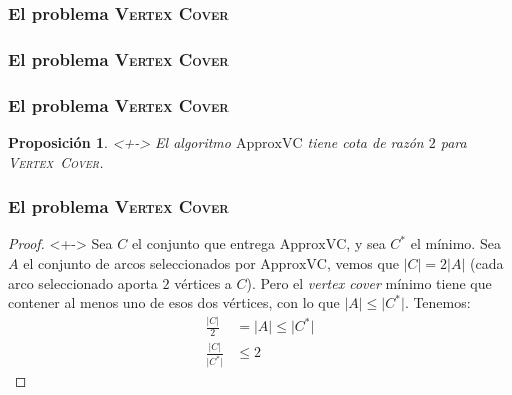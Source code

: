 \documentclass[english, spanish, fleqn,%
hyperref = {colorlinks, urlcolor = blue}%
]{beamer}
\newtheorem{proposition}{Proposición}
\begin{document}
\begin{frame}
  \setcounter{beamerpauses}{2}
  \frametitle{El problema \textsc{Vertex Cover}}

\end{frame}

\begin{frame}
  \frametitle{El problema \textsc{Vertex Cover}}

    \begin{algorithm}[H]
      \DontPrintSemicolon

    \end{algorithm}
\end{frame}

\begin{frame}
  \setcounter{beamerpauses}{2}
  \frametitle{El problema \textsc{Vertex Cover}}

  \begin{proposition}<+->
    El algoritmo \(\mathrm{ApproxVC}\) tiene cota de razón \(2\)
    para \textsc{Vertex~Cover}.
  \end{proposition}
\end{frame}

\begin{frame}
  \setcounter{beamerpauses}{2}
  \frametitle{El problema \textsc{Vertex Cover}}

  \begin{proof}<+->
    Sea \(C\) el conjunto que entrega \(\mathrm{ApproxVC}\),
    y sea \(C^*\) el mínimo.
    Sea \(A\) el conjunto de arcos
    seleccionados por \(\mathrm{ApproxVC}\),
    vemos que \(\lvert C \rvert = 2 \lvert A \rvert\)
    (cada arco seleccionado aporta \(2\) vértices a \(C\)).
    Pero el \emph{\foreignlanguage{english}{vertex cover}} mínimo
    tiene que contener al menos uno de esos dos vértices,
    con lo que \(\lvert A \rvert \le \lvert C^* \rvert\).
    Tenemos:
    \begin{align*}
      \frac{\lvert C \rvert}{2}
        &= \lvert A \rvert
         \le \lvert C^* \rvert \\
      \frac{\lvert C \rvert}{\lvert C^* \rvert}
        &\le 2
    \end{align*}
    \qedhere
  \end{proof}
\end{frame}
\end{document}
